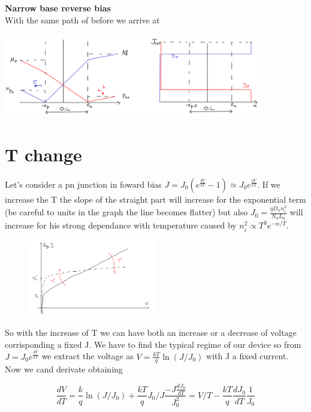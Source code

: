 {\bf Narrow base reverse bias}\\
With the same path of before we arrive at

\centering
\includegraphics[width=0.85\textwidth]{nwall.png}\\
\raggedright

\section{T change}
Let's consider a pn junction in foward bias $J=J_0(e^{\frac{qV}{kT}}-1)\simeq J_0e^{\frac{qV}{kT}}$. If we increase the T the slope of the straight part will increase for the exponential term (be careful to units in the graph the line becomes flatter) but also $J_0=\frac{qD_nn_i^2}{N_aL_n}$ will increase for his strong dependance with temperature caused by $n_i^2\propto T^3e^{-\alpha/T}$.

\begin{figure}
\includegraphics[width=0.5\textwidth]{JwithT.png}
\end{figure}

So with the increase of T we can have both an increase or a decrease of voltage corrisponding a fixed J. We have to find the typical regime of our device so from $J=J_0e^{\frac{qV}{kT}}$ we extract the voltage as $V=\frac{kT}{q}\ln(J/J_0)$ with J a fixed current. Now we cand derivate obtaining

\begin{equation}
\frac{dV}{dT}= \frac{k}{q}\ln(J/J_0)+\frac{kT}{q}J_0/J \frac{-J \frac{dJ_0}{dT}}{J_0^2}=V/T-\frac{kT}{q}\frac{dJ_0}{dT}\frac{1}{J_0}
\end{equation}

